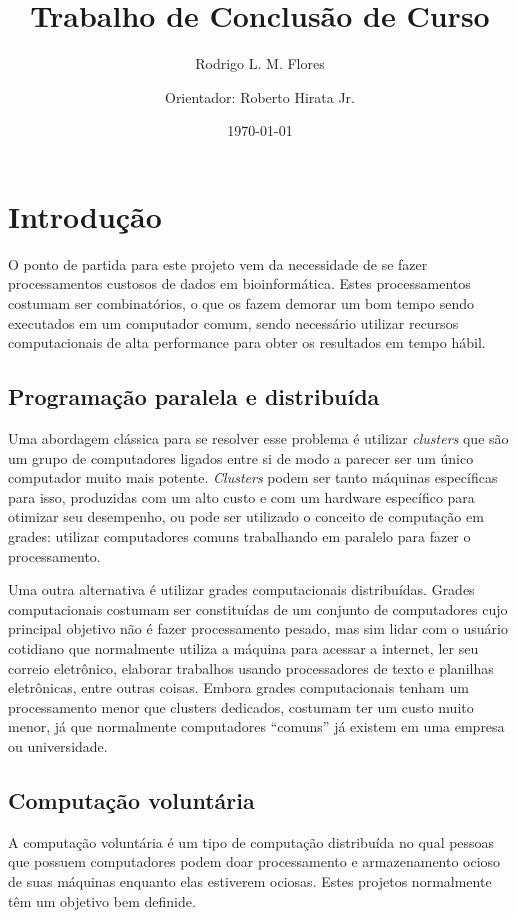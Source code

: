 \documentclass[a4paper,12pt,titlepage]{article}
\title{Trabalho de Conclusão de Curso \\ }
\author{Rodrigo L. M. Flores \and
        Orientador: Roberto Hirata Jr. }
\date{\today}
\begin{document}
\maketitle

\section{Introdução}

O ponto de partida para este projeto vem da necessidade de se fazer processamentos custosos de 
dados em bioinformática. Estes processamentos costumam ser combinatórios, o que os fazem
demorar um bom tempo sendo executados em um computador comum, sendo necessário utilizar recursos
computacionais de alta performance para obter os resultados em tempo hábil.

\subsection{Programação paralela e distribuída}

Uma abordagem clássica para se resolver esse problema é utilizar \textit{clusters} que são um grupo de computadores
ligados entre si de modo a parecer ser um único computador muito mais potente. \textit{Clusters} podem ser tanto máquinas
específicas para isso, produzidas com um alto custo e com um hardware específico para otimizar seu desempenho, ou 
pode ser utilizado o conceito de computação em grades: utilizar computadores comuns trabalhando em paralelo 
para fazer o processamento. 

Uma outra alternativa é utilizar grades computacionais distribuídas. Grades computacionais costumam ser constituídas
de um conjunto de computadores cujo principal objetivo não é fazer processamento pesado, mas sim lidar com o usuário 
cotidiano que normalmente utiliza a máquina para acessar a internet, ler seu correio eletrônico, elaborar
trabalhos usando processadores de texto e planilhas eletrônicas, entre outras coisas. Embora grades computacionais tenham um 
processamento menor que clusters dedicados, costumam ter um custo muito menor, já que normalmente computadores ``comuns'' já existem em
uma empresa ou universidade. 


\subsection{Computação voluntária}


A computação voluntária é um tipo de computação distribuída no qual pessoas que possuem computadores podem doar processamento e
armazenamento ocioso de suas máquinas enquanto elas estiverem ociosas. Estes projetos normalmente têm um objetivo bem definide.
\end{document}
